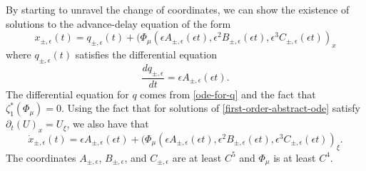 By starting to unravel the change of coordinates, we can show the existence of solutions to the advance-delay equation of the form
\begin{equation}
	x_{\pm,\epsilon}(t) = q_{\pm, \epsilon}(t) + (\Phi_\mu(\epsilon A_{\pm, \epsilon}(\epsilon t),\epsilon^2 B_{\pm, \epsilon}(\epsilon t) ,\epsilon^3 C_{\pm, \epsilon}(\epsilon t))_x
\end{equation}
where \(q_{\pm, \epsilon}(t)\) satisfies the differential equation
\begin{equation}
	\frac{dq_{\pm, \epsilon}}{dt} =  \epsilon A_{\pm, \epsilon}(\epsilon t).
\end{equation}
The differential equation for \(q\) comes from \cref{ode-for-q} and the fact that \(\zeta_1^*(\Phi_\mu) = 0\). Using the fact that for solutions of \cref{first-order-abstract-ode} satisfy \(\partial_t (U)_x = U_\xi\), we also have that
\begin{equation}
	\dot x_{\pm, \epsilon}(t) =  \epsilon A_{\pm, \epsilon}(\epsilon t) + (\Phi_\mu(\epsilon A_{\pm, \epsilon}(\epsilon t),\epsilon^2 B_{\pm, \epsilon}(\epsilon t) ,\epsilon^3 C_{\pm, \epsilon}(\epsilon t))_\xi.
\end{equation}
The coordinates \(A_{\pm, \epsilon}\), \(B_{\pm, \epsilon}\), and  \(C_{\pm, \epsilon}\) are at least \(C^5\) and \(\Phi_\mu\) is at least \(C^4\).

